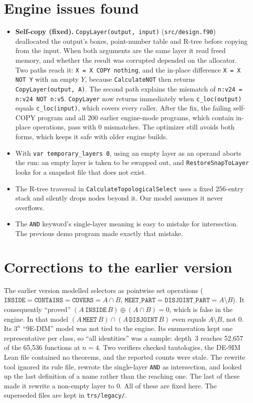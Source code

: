 \documentclass[11pt]{article}
\newcommand{\op}[1]{\texttt{#1}}
\begin{document}
\section{Engine issues found}\label{sec:issues}
\begin{itemize}
\item \textbf{Self-copy (fixed).} \texttt{CopyLayer(output, input)} (\texttt{src/design.f90}) deallocated the output's boxes, point-number table and R-tree before copying from the input. When both arguments are the same layer it read freed memory, and whether the result was corrupted depended on the allocator. Two paths reach it: \texttt{X = X COPY nothing}, and the in-place difference \texttt{X = X NOT Y} with an empty $Y$, because \texttt{CalculateNOT} then returns \texttt{CopyLayer(output, A)}. The second path explains the mismatch of \texttt{n:v24 = n:v24 NOT n:v5}. \texttt{CopyLayer} now returns immediately when \texttt{c\_loc(output)} equals \texttt{c\_loc(input)}, which covers every caller. After the fix, the failing self-COPY program and all 200 earlier engine-mode programs, which contain in-place operations, pass with 0 mismatches. The optimizer still avoids both forms, which keeps it safe with older engine builds.
\item With \texttt{var temporary\_layers 0}, using an empty layer as an operand aborts the run: an empty layer is taken to be swapped out, and \texttt{RestoreSnapToLayer} looks for a snapshot file that does not exist.
\item The R-tree traversal in \texttt{CalculateTopologicalSelect} uses a fixed 256-entry stack and silently drops nodes beyond it. Our model assumes it never overflows.
\item The \op{AND} keyword's single-layer meaning is easy to mistake for intersection. The previous demo program made exactly that mistake.
\end{itemize}

\section{Corrections to the earlier version}\label{sec:corrections}
The earlier version modelled selectors as pointwise set operations ($\op{INSIDE}=\op{CONTAINS}=\op{COVERS}=A\cap B$, $\op{MEET\_PART}=\op{DISJOINT\_PART}=A\setminus B$). It consequently ``proved'' $(A\,\op{INSIDE}\,B)\oplus(A\cap B)=0$, which is false in the engine. In that model $(A\,\op{MEET}\,B)\cap(A\,\op{DISJOINT}\,B)$ even equals $A\setminus B$, not $0$. Its $3^n$ ``9E-DIM'' model was not tied to the engine. Its enumeration kept one representative per class, so ``all identities'' was a sample: depth~3 reaches 52{,}657 of the 65{,}536 functions at $n=4$. Two verifiers checked tautologies, the DE-9IM Lean file contained no theorems, and the reported counts were stale. The rewrite tool ignored its rule file, rewrote the single-layer \op{AND} as intersection, and looked up the last definition of a name rather than the reaching one. The last of these made it rewrite a non-empty layer to $0$. All of these are fixed here. The superseded files are kept in \texttt{trs/legacy/}.
\end{document}
